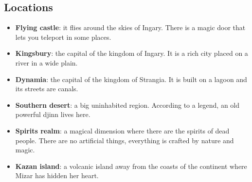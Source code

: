 \subsection{Locations}
\begin{itemize}
	\item \textbf{Flying castle}: it flies around the skies of Ingary. There is a magic door that lets you teleport in some places.
	\item \textbf{Kingsbury}: the capital of the kingdom of Ingary. It is a rich city placed on a river in a wide plain.
	\item \textbf{Dynamia}: the capital of the kingdom of Strangia. It is built on a lagoon and its streets are canals.
	\item \textbf{Southern desert}: a big uninhabited region. According to a legend, an old powerful djinn lives here.
	\item \textbf{Spirits realm}: a magical dimension where there are the spirits of dead people. There are no artificial things, everything is crafted by nature and magic.
	\item \textbf{Kazan island}: a volcanic island away from the coasts of the continent where Mizar has hidden her heart.

\end{itemize}
